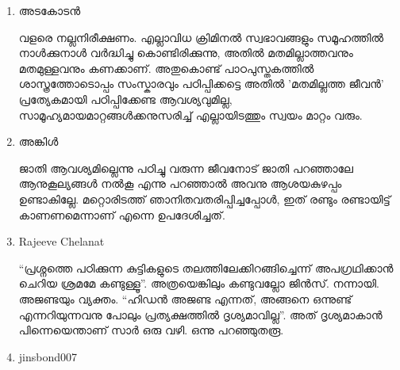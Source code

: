 \begin{enumerate}

\item{അടകോടന്‍}

വളരെ നല്ലനിരീക്ഷണം. എല്ലാവിധ ക്രിമിനല്‍ സ്വഭാവങ്ങളും സമൂഹത്തില്‍ നാള്‍ക്കുനാള്‍ വര്‍ദ്ധിച്ചു കൊണ്ടിരിക്കുന്നു, 
അതില്‍ മതമില്ലാത്തവനും മതമുള്ളവനും കണക്കാണ്. അതുകൊണ്ട് പാഠപുസ്തകത്തില്‍ ശാസ്ത്രത്തോടൊപ്പം സംസ്കാരവും 
പഠിപ്പിക്കട്ടെ അതില്‍ 'മതമില്ലത്ത ജീവന്‍' പ്രത്യേകമായി പഠിപ്പിക്കേണ്ട ആവശ്യവുമില്ല, സാമൂഹ്യമായമാറ്റങ്ങള്‍ക്കനുസരിച്ച് 
എല്ലായിടത്തും സ്വയം മാറ്റം വരും.

\item{അങ്കിള്‍}

ജാതി ആവശ്യമില്ലെന്നു പഠിച്ചു വരുന്ന ജീവനോട് ജാതി പറഞ്ഞാലേ ആനുകൂല്യങ്ങള്‍ നല്‍കൂ എന്നു പറഞ്ഞാല്‍ അവനു 
ആശയകുഴപ്പം ഉണ്ടാകില്ലേ. മറ്റൊരിടത്ത് ഞാനിതവതരിപ്പിച്ചപ്പോള്‍, ഇത് രണ്ടും രണ്ടായിട്ട് കാണണമെന്നാണ് എന്നെ 
ഉപദേശിച്ചത്.

\item{Rajeeve Chelanat}

``പ്രശ്നത്തെ പഠിക്കുന്ന കുട്ടികളുടെ തലത്തിലേക്കിറങ്ങിച്ചെന്ന് അപഗ്രഥിക്കാന്‍ ചെറിയ ശ്രമമേ കണ്ടുള്ളൂ''. അത്രയെങ്കിലും 
കണ്ടുവല്ലോ ജിന്‍സ്. നന്നായി. അജണ്ടയും വ്യക്തം. ``ഹിഡന്‍ അജണ്ട എന്നത്, അങ്ങനെ ഒന്നുണ്ട് എന്നറിയുന്നവനു 
പോലും പ്രത്യക്ഷത്തില്‍ ദൃശ്യമാവില്ല''. അത് ദൃശ്യമാകാന്‍ പിന്നെയെന്താണ് സാര്‍ ഒരു വഴി. ഒന്നു പറഞ്ഞുതരൂ.

\item{jinsbond007}


\end{enumerate}
